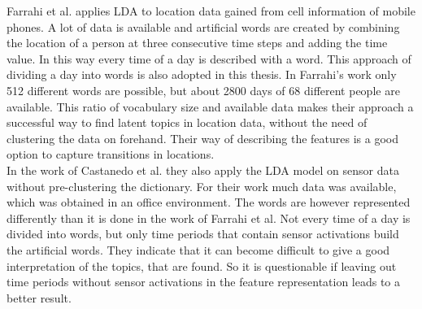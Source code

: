 
Farrahi et al. \cite{farrahi2008daily} applies LDA to location data gained from cell information of mobile phones. A lot of data is available and artificial words are created by combining the location of a person at three consecutive time steps and adding the time value. In this way every time of a day is described with a word. This approach of dividing a day into words is also adopted in this thesis. In Farrahi's work only 512 different words are possible, but about 2800 days of 68 different people are available. This ratio of vocabulary size and available data makes their approach a successful way to find latent topics in location data, without the need of clustering the data on forehand. Their way of describing the features is a good option to capture transitions in locations.\\

In the work of Castanedo et al. \cite{EXSY:EXSY12033} they also apply the LDA model on sensor data without pre-clustering the dictionary. For their work much data was available, which was obtained in an office environment. The words are however represented differently than it is done in the work of Farrahi et al. Not every time of a day is divided into words, but only time periods that contain sensor activations build the artificial words. They indicate that it can become difficult to give a good interpretation of the topics, that are found. So it is questionable if leaving out time periods without sensor activations in the feature representation leads to a better result.\\





